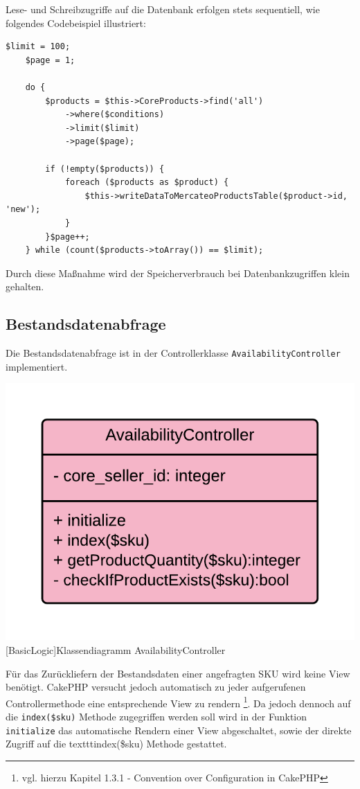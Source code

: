 	Lese- und Schreibzugriffe auf die Datenbank erfolgen stets sequentiell, wie folgendes Codebeispiel illustriert:
	\lstset{language=php}
	\begin{lstlisting}[]
	$limit = 100;
	$page = 1;
	
	do {
	    $products = $this->CoreProducts->find('all')
	        ->where($conditions)
	        ->limit($limit)
	        ->page($page);
	        
	    if (!empty($products)) {
	        foreach ($products as $product) {        
	            $this->writeDataToMercateoProductsTable($product->id, 'new');
	        }
	    }$page++;
	} while (count($products->toArray()) == $limit);
	\end{lstlisting} 
	Durch diese Maßnahme wird der Speicherverbrauch bei Datenbankzugriffen klein gehalten.
	
	\subsection{Bestandsdatenabfrage}
	
	Die Bestandsdatenabfrage ist in der Controllerklasse \texttt{AvailabilityController} implementiert.
	
	\begin{minipage}{\linewidth}
		\vspace{1em}
		\centering
		\includegraphics[width=0.4 \linewidth]{img/AvailabilityControllerUML}
		[BasicLogic]{Klassendiagramm AvailabilityController}
		\vspace{1em}
	\end{minipage}
	
	Für das Zurückliefern der Bestandsdaten einer angefragten SKU wird keine View benötigt. CakePHP versucht jedoch automatisch zu jeder aufgerufenen Controllermethode eine entsprechende View zu rendern \footnote{vgl. hierzu Kapitel 1.3.1 - Convention over Configuration in CakePHP}.  Da jedoch dennoch auf die \texttt{index(\$sku)} Methode zugegriffen werden soll wird in der Funktion \texttt{initialize} das automatische Rendern einer View abgeschaltet, sowie der direkte Zugriff auf die texttt{index(\$sku)} Methode gestattet.
	
